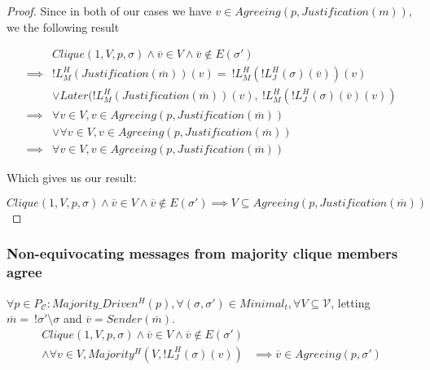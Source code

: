 \begin{proof}
Since in both of our cases we have $v \in Agreeing(p, Justification(m))$, we the following result

\begin{align}
        &Clique(1, V, p, \sigma) \land \overline{v} \in V \land \overline{v} \notin E(\sigma') \\
\implies&!L^H_M(Justification(\overline{m}))(v) =~!L^H_M(!L^H_J(\sigma)(\overline{v}))(v) \\
        &\lor Later(!L^H_M(Justification(\overline{m}))(v),~!L^H_M(!L^H_J(\sigma)(\overline{v})(v))\\
\implies&\forall v \in V, v \in Agreeing(p, Justification(\overline{m})) \\
        &\lor \forall v \in V, v \in Agreeing(p, Justification(\overline{m})) \\
\implies&\forall v \in V, v \in Agreeing(p, Justification(\overline{m}))
\end{align}

Which gives us our result:

$$
Clique(1, V, p, \sigma) \land \overline{v} \in V \land \overline{v} \notin E(\sigma') \implies V \subseteq Agreeing(p, Justification(\overline{m}))
$$

\end{proof}



\subsubsection{Non-equivocating messages from majority clique members agree}


\begin{lemma}
$\forall p \in P_{\mathcal{C}} : Majority\_Driven^H(p), \forall (\sigma, \sigma') \in Minimal_t, \forall V \subseteq \mathcal{V}$, letting $\overline{m} =~!\sigma'\setminus\sigma$ and $\overline{v} = Sender(\overline{m})$.
\begin{align}
Clique(1, V, p, \sigma) \land \overline{v} \in V \land \overline{v} \notin E(\sigma')& \\
\land \forall v \in V, Majority^H(V, !L^H_J(\sigma)(v)) & \implies \overline{v} \in Agreeing(p, \sigma')
\end{align}

\end{lemma}

